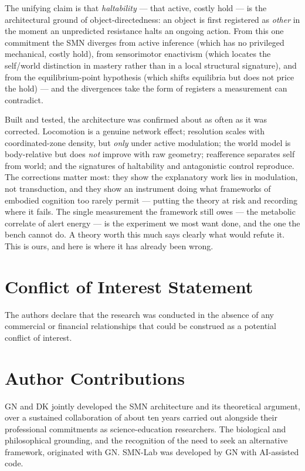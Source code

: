 \documentclass[utf8]{FrontiersinHarvard} %
\begin{document}
The unifying claim is that \emph{haltability} --- that active, costly hold --- is the architectural ground of object-directedness: an object is first registered as \emph{other} in the moment an unpredicted resistance halts an ongoing action. From this one commitment the SMN diverges from active inference (which has no privileged mechanical, costly hold), from sensorimotor enactivism (which locates the self/world distinction in mastery rather than in a local structural signature), and from the equilibrium-point hypothesis (which shifts equilibria but does not price the hold) --- and the divergences take the form of registers a measurement can contradict.

Built and tested, the architecture was confirmed about as often as it was corrected. Locomotion is a genuine network effect; resolution scales with coordinated-zone density, but \emph{only} under active modulation; the world model is body-relative but does \emph{not} improve with raw geometry; reafference separates self from world; and the signatures of haltability and antagonistic control reproduce. The corrections matter most: they show the explanatory work lies in modulation, not transduction, and they show an instrument doing what frameworks of embodied cognition too rarely permit --- putting the theory at risk and recording where it fails. The single measurement the framework still owes --- the metabolic correlate of alert energy --- is the experiment we most want done, and the one the bench cannot do. A theory worth this much says clearly what would refute it. This is ours, and here is where it has already been wrong.

\section*{Conflict of Interest Statement}
The authors declare that the research was conducted in the absence of any commercial or financial relationships that could be construed as a potential conflict of interest.

\section*{Author Contributions}
GN and DK jointly developed the SMN architecture and its theoretical argument, over a sustained collaboration of about ten years carried out alongside their professional commitments as science-education researchers. The biological and philosophical grounding, and the recognition of the need to seek an alternative framework, originated with GN. SMN-Lab was developed by GN with AI-assisted code.
\end{document}
